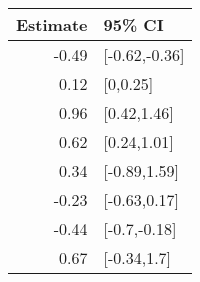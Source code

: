 \begin{tabular}{rl}
  \hline
Estimate & 95\% CI \\ 
  \hline
-0.49 & [-0.62,-0.36] \\ 
  0.12 & [0,0.25] \\ 
  0.96 & [0.42,1.46] \\ 
  0.62 & [0.24,1.01] \\ 
  0.34 & [-0.89,1.59] \\ 
  -0.23 & [-0.63,0.17] \\ 
  -0.44 & [-0.7,-0.18] \\ 
  0.67 & [-0.34,1.7] \\ 
   \hline
\end{tabular}

